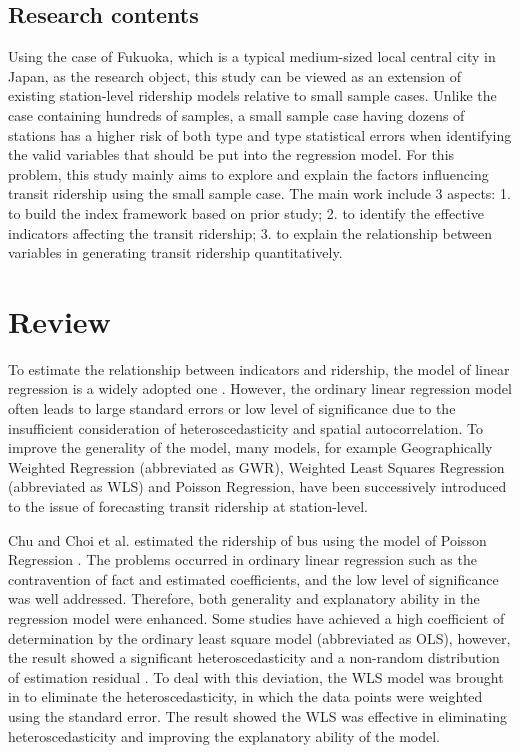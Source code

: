 \subsection{Research contents}
%
Using the case of Fukuoka, which is a typical medium-sized local central city in Japan, as the research object, this study can be viewed as an extension of existing station-level ridership models relative to small sample cases. Unlike the case containing hundreds of samples, a small sample case having dozens of stations has a higher risk of both type \uppercase\expandafter{} and type \uppercase\expandafter{} statistical errors when identifying the valid variables that should be put into the regression model. For this problem, this study mainly aims to explore and explain the factors influencing transit ridership using the small sample case. The main work include 3 aspects: 1. to build the index framework based on prior study; 2. to identify the effective indicators affecting the transit ridership; 3. to explain the relationship between variables in generating transit ridership quantitatively.

\section{Review}
To estimate the relationship between indicators and ridership, the model of linear regression is a widely adopted one \cite{cervero1997travel,chakraborty2013land}. However, the ordinary linear regression model often leads to large standard errors or low level of significance due to the insufficient consideration of heteroscedasticity and spatial autocorrelation. To improve the generality of the model, many models, for example Geographically Weighted Regression (abbreviated as GWR), Weighted Least Squares Regression (abbreviated as WLS) and Poisson Regression, have been successively introduced to the issue of forecasting transit ridership at station-level. 

Chu and Choi et al. estimated the ridership of bus using the model of Poisson Regression \cite{choi2012analysis,chu2004ridership}. The problems occurred in ordinary linear regression such as the contravention of fact and estimated coefficients, and the low level of significance was well addressed. Therefore, both generality and explanatory ability in the regression model were enhanced. Some studies have achieved a high coefficient of determination by the ordinary least square model (abbreviated as OLS), however, the result showed a significant heteroscedasticity and a non-random distribution of estimation residual \cite{kuby2004factors}. To deal with this deviation, the WLS model was brought in to eliminate the heteroscedasticity, in which the data points were weighted using the standard error. The result showed the WLS was effective in eliminating heteroscedasticity and improving the explanatory ability of the model.

